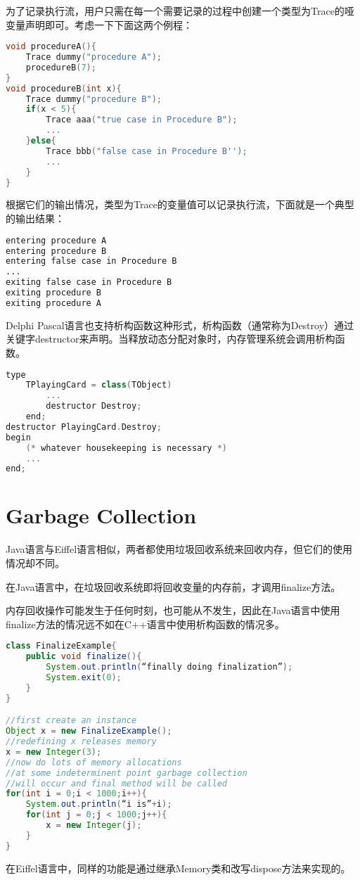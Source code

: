 为了记录执行流，用户只需在每一个需要记录的过程中创建一个类型为Trace的哑变量声明即可。考虑一下下面这两个例程：




\begin{lstlisting}[language=C++]
void procedureA(){
	Trace dummy("procedure A");
	procedureB(7);
}
void procedureB(int x){
	Trace dummy("procedure B");
	if(x < 5){
		Trace aaa("true case in Procedure B");
		...
	}else{
		Trace bbb("false case in Procedure B'');
		...
	}
}
\end{lstlisting}

根据它们的输出情况，类型为Trace的变量值可以记录执行流，下面就是一个典型的输出结果：



\begin{lstlisting}[language=bash]
entering procedure A
entering procedure B
entering false case in Procedure B
...
exiting false case in Procedure B
exiting procedure B
exiting procedure A
\end{lstlisting}

Delphi Pascal语言也支持析构函数这种形式，析构函数（通常称为Destroy）通过关键字destructor来声明。当释放动态分配对象时，内存管理系统会调用析构函数。



\begin{lstlisting}[language=C++]
type
	TPlayingCard = class(TObject)
		...	
		destructor Destroy;
	end;
destructor PlayingCard.Destroy;
begin
	(* whatever housekeeping is necessary *)
	...
end;
\end{lstlisting}


\section{Garbage Collection}


Java语言与Eiffel语言相似，两者都使用垃圾回收系统来回收内存，但它们的使用情况却不同。

\begin{compactitem}
\item 在Java语言中，在垃圾回收系统即将回收变量的内存前，才调用finalize方法。

内存回收操作可能发生于任何时刻，也可能从不发生，因此在Java语言中使用finalize方法的情况远不如在C++语言中使用析构函数的情况多。


\begin{lstlisting}[language=Java]
class FinalizeExample{
	public void finalize(){
		System.out.println(“finally doing finalization”);
		System.exit(0);
	}
}

//first create an instance
Object x = new FinalizeExample();
//redefining x releases memory
x = new Integer(3);
//now do lots of memory allocations
//at some indeterminent point garbage collection
//will occur and final method will be called
for(int i = 0;i < 1000;i++){
	System.out.println(“i is”+i);
	for(int j = 0;j < 1000;j++){
		x = new Integer(j);
	}
}
\end{lstlisting}

\item 在Eiffel语言中，同样的功能是通过继承Memory类和改写dispose方法来实现的。
\end{compactitem}

